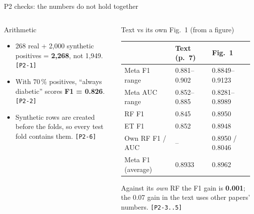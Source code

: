 \documentclass[aspectratio=169,10pt,t,xcolor={table}]{beamer}
\begin{document}
\begin{frame}{P2 checks: the numbers do not hold together}
\begin{columns}[T]
\begin{alertblock}{Arithmetic}
\footnotesize
\begin{itemize}
  \item 268 real + 2,000 synthetic positives = \textbf{2,268}, not 1,949. \texttt{[P2-1]}
  \item With 70\,\% positives, ``always diabetic'' scores \textbf{F1 = 0.826}. \texttt{[P2-2]}
  \item Synthetic rows are created before the folds, so every test fold contains them. \texttt{[P2-6]}
\end{itemize}
\end{alertblock}
\begin{alertblock}{Text vs its own Fig.~1 (from a figure)}
\scriptsize
\begin{tabular}{lll}
\toprule
 & Text (p.~7) & Fig.~1 \\
\midrule
Meta F1 range & 0.881--0.902 & 0.8849--0.9123 \\
Meta AUC range & 0.852--0.885 & 0.8281--0.8989 \\
RF F1 & 0.845 & 0.8950 \\
ET F1 & 0.852 & 0.8948 \\
Own RF F1 / AUC & -- & 0.8950 / 0.8046 \\
Meta F1 (average) & 0.8933 & 0.8962 \\
\bottomrule
\end{tabular}
\par\smallskip\footnotesize
Against its \emph{own} RF the F1 gain is \textbf{0.001}; the 0.07 gain in the text uses other papers' numbers. \texttt{[P2-3..5]}
\end{alertblock}
\end{columns}
\end{frame}
\end{document}
